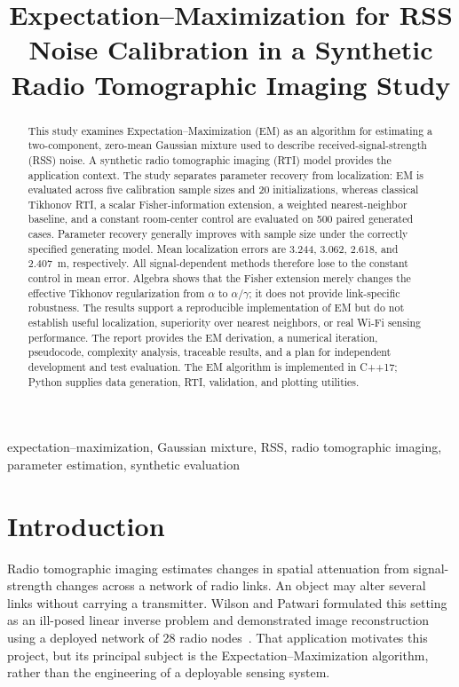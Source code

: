 \documentclass[conference,letterpaper]{IEEEtran}
\title{Expectation--Maximization for RSS Noise Calibration in a Synthetic Radio Tomographic Imaging Study}
\author{\IEEEauthorblockN{Camilo V\'asquez}
\IEEEauthorblockA{School of Mathematical and Computational Sciences\\
Yachay Tech University\\Urcuqu\'i, Ecuador}}
\begin{document}
\maketitle
\begin{abstract}
This study examines Expectation--Maximization (EM) as an algorithm for estimating a two-component, zero-mean Gaussian mixture used to describe received-signal-strength (RSS) noise. A synthetic radio tomographic imaging (RTI) model provides the application context. The study separates parameter recovery from localization: EM is evaluated across five calibration sample sizes and 20 initializations, whereas classical Tikhonov RTI, a scalar Fisher-information extension, a weighted nearest-neighbor baseline, and a constant room-center control are evaluated on 500 paired generated cases. Parameter recovery generally improves with sample size under the correctly specified generating model. Mean localization errors are 3.244, 3.062, 2.618, and 2.407~m, respectively. All signal-dependent methods therefore lose to the constant control in mean error. Algebra shows that the Fisher extension merely changes the effective Tikhonov regularization from $\alpha$ to $\alpha/\gamma$; it does not provide link-specific robustness. The results support a reproducible implementation of EM but do not establish useful localization, superiority over nearest neighbors, or real Wi-Fi sensing performance. The report provides the EM derivation, a numerical iteration, pseudocode, complexity analysis, traceable results, and a plan for independent development and test evaluation. The EM algorithm is implemented in C++17; Python supplies data generation, RTI, validation, and plotting utilities.
\end{abstract}
\begin{IEEEkeywords}
expectation--maximization, Gaussian mixture, RSS, radio tomographic imaging, parameter estimation, synthetic evaluation
\end{IEEEkeywords}

\section{Introduction}
Radio tomographic imaging estimates changes in spatial attenuation from signal-strength changes across a network of radio links. An object may alter several links without carrying a transmitter. Wilson and Patwari formulated this setting as an ill-posed linear inverse problem and demonstrated image reconstruction using a deployed network of 28 radio nodes~\cite{wilson2010}. That application motivates this project, but its principal subject is the Expectation--Maximization algorithm, rather than the engineering of a deployable sensing system.
\end{document}
